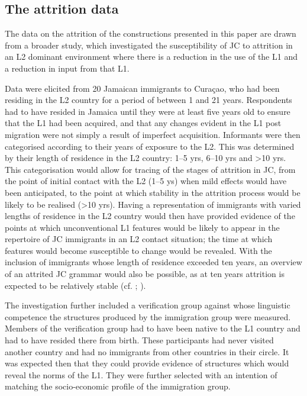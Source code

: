 \documentclass[output=paper,colorlinks,citecolor=brown]{langscibook}
\begin{document}
\subsection{The attrition data} \label{sec:messamk:3.2}
The data on the attrition of the constructions presented in this paper are drawn from a broader study, which investigated the susceptibility of JC to attrition in an L2 dominant environment where there is a reduction in the use of the L1 and a reduction in input from that L1.

Data were elicited from 20 Jamaican immigrants to Curaçao, who had been residing in the L2 country for a period of between 1 and 21 years. Respondents had to have resided in Jamaica until they were at least five years old to ensure that the L1 had been acquired, and that any changes evident in the L1 post migration were not simply a result of imperfect acquisition. Informants were then categorised according to their years of exposure to the L2. This was determined by their length of residence in the L2 country: 1--5 yrs, 6--10 yrs and >10 yrs. This categorisation would allow for tracing of the stages of attrition in JC, from the point of initial contact with the L2 (1--5 ys) when mild effects would have been anticipated, to the point at which stability in the attrition process would be likely to be realised (>10 yrs). Having a representation of immigrants with varied lengths of residence in the L2 country would then have provided evidence of the points at which unconventional L1 features would be likely to appear in the repertoire of JC immigrants in an L2 contact situation; the time at which features would become susceptible to change would be revealed. With the inclusion of immigrants whose length of residence exceeded ten years, an overview of an attrited JC grammar would also be possible, as at ten years attrition is expected to be relatively stable (cf. \citealt{DeBotClyne1994}; \citealt{Waas1993}).

The investigation further included a verification group against whose linguistic competence the structures produced by the immigration group were measured. Members of the verification group had to have been native to the L1 country and had to have resided there from birth. These participants had never visited another country and had no immigrants from other countries in their circle. It was expected then that they could provide evidence of structures which would reveal the norms of the L1. They were further selected with an intention of matching the socio-economic profile of the immigration group.
\end{document}
